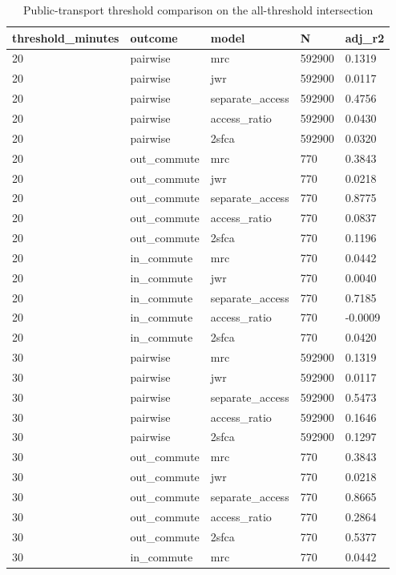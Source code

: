 \begin{table}[htbp]
\centering
\scriptsize
\caption{Public-transport threshold comparison on the all-threshold intersection}
\label{tab:pt-fixed}
\begin{tabular}{lllll}
\toprule
threshold\_minutes & outcome & model & N & adj\_r2 \\
\midrule
20 & pairwise & mrc & 592900 & 0.1319 \\
20 & pairwise & jwr & 592900 & 0.0117 \\
20 & pairwise & separate\_access & 592900 & 0.4756 \\
20 & pairwise & access\_ratio & 592900 & 0.0430 \\
20 & pairwise & 2sfca & 592900 & 0.0320 \\
20 & out\_commute & mrc & 770 & 0.3843 \\
20 & out\_commute & jwr & 770 & 0.0218 \\
20 & out\_commute & separate\_access & 770 & 0.8775 \\
20 & out\_commute & access\_ratio & 770 & 0.0837 \\
20 & out\_commute & 2sfca & 770 & 0.1196 \\
20 & in\_commute & mrc & 770 & 0.0442 \\
20 & in\_commute & jwr & 770 & 0.0040 \\
20 & in\_commute & separate\_access & 770 & 0.7185 \\
20 & in\_commute & access\_ratio & 770 & -0.0009 \\
20 & in\_commute & 2sfca & 770 & 0.0420 \\
30 & pairwise & mrc & 592900 & 0.1319 \\
30 & pairwise & jwr & 592900 & 0.0117 \\
30 & pairwise & separate\_access & 592900 & 0.5473 \\
30 & pairwise & access\_ratio & 592900 & 0.1646 \\
30 & pairwise & 2sfca & 592900 & 0.1297 \\
30 & out\_commute & mrc & 770 & 0.3843 \\
30 & out\_commute & jwr & 770 & 0.0218 \\
30 & out\_commute & separate\_access & 770 & 0.8665 \\
30 & out\_commute & access\_ratio & 770 & 0.2864 \\
30 & out\_commute & 2sfca & 770 & 0.5377 \\
30 & in\_commute & mrc & 770 & 0.0442 \\

\end{tabular}
\end{table}
